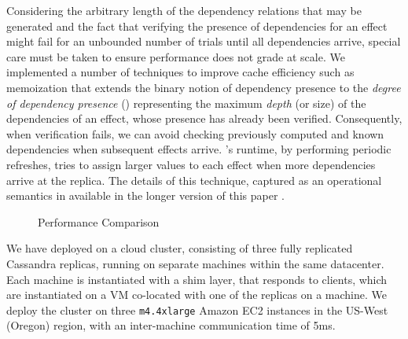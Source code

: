 \documentclass[authorversion]{sig-alternate-05-2015}
\begin{document}
Considering the arbitrary length of the dependency relations that may
be generated and the fact that verifying the presence of dependencies for
an effect might fail for an unbounded number of trials until all
dependencies arrive, special care must be taken to ensure performance
does not grade at scale.  We implemented a number of techniques to
improve cache efficiency such as memoization that extends the binary
notion of dependency presence to the \emph{degree of dependency
  presence} (\DDP{}) representing the maximum \emph{depth} (or size)
of the dependencies of an effect, whose presence has already been
verified.  Consequently, when verification fails, we can avoid
checking previously computed and known dependencies when subsequent
effects arrive.  \tool's runtime, by performing periodic \DDP{}
refreshes, tries to assign larger \DDP{} values to each effect when
more dependencies arrive at the replica. The details of this
technique, captured as an operational semantics in available in the longer version of this paper 
\cite{syncope}.

\begin{figure}[h]
\centering
\hfil
\hfil
\label{fig:eval}
\caption{Performance Comparison}
\end{figure}

We have deployed \tool\; on a cloud cluster,
consisting of three fully replicated Cassandra replicas, running on
separate machines within the same
datacenter.
Each machine is instantiated with a
\tool\; shim layer, that responds to clients,
 which are instantiated on a VM
co-located with one of the replicas on a machine.
We deploy the cluster on three \texttt{m4.4xlarge} Amazon EC2 instances
in the US-West (Oregon) region, with an inter-machine communication time of 5ms.
\end{document}
